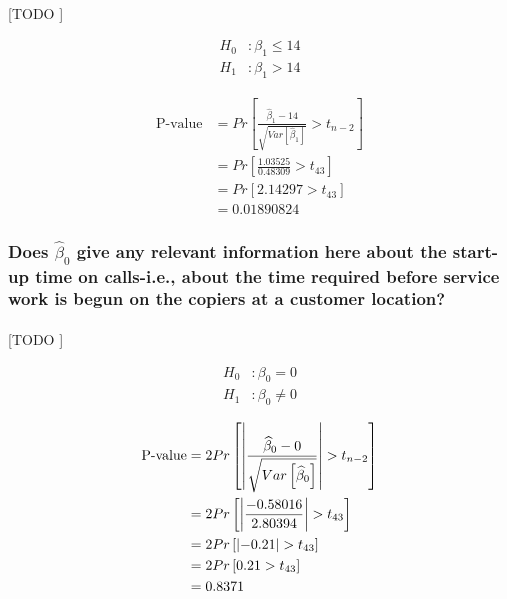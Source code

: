 \documentclass{article}
\begin{document}
        \paragraph{}
        [TODO ]

        \begin{equation}
          \begin{split}
            H_0&: \beta_1 \leq 14 \\
            H_1&: \beta_1 > 14
          \end{split}
        \end{equation}


        \begin{equation}
          \begin{split}
            \text{P-value} &= Pr\left[\frac{\widehat{\beta}_1 - 14}{\sqrt{Var\left[\widehat{\beta}_1\right]}} > t_{n-2}\right] \\
            &= Pr\left[\frac{1.03525}{0.48309} > t_{43}\right] \\
            &= Pr\left[2.14297 > t_{43}\right] \\
            &= 0.01890824
          \end{split}
        \end{equation}


      \subsubsection{Does $\widehat{\beta}_0$ give any relevant information here about the start-up time on calls-i.e., about the time required before service work is begun on the copiers at a customer location?}
      \label{sec:copiers-2.5e}
        \paragraph{}
        [TODO ]

        \begin{equation}
          \begin{split}
            H_0&: \beta_0 = 0 \\
            H_1&: \beta_0 \neq 0
          \end{split}
        \end{equation}

        \begin{equation}
          \begin{split}
            \text{P-value} &= 2Pr\left[\abs{\frac{\widehat{\beta}_0 - 0}{\sqrt{Var\left[\widehat{\beta}_0\right]}}} > t_{n-2}\right] \\
            &= 2Pr\left[\abs{\frac{-0.58016}{2.80394}} > t_{43}\right] \\
            &= 2Pr\left[\abs{-0.21} > t_{43} \right] \\
            &= 2Pr\left[0.21 > t_{43} \right] \\
            &= 0.8371
          \end{split}
        \end{equation}
\end{document}
